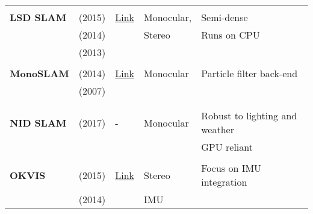 {\begin{longtable}{l|l|l|l|l}
			&                                   &                                                                    &                       &\\
			\textbf{LSD SLAM}      & \cite{Engel2015} (2015)           & {\href{https://github.com/tum-vision/lsd_slam}{Link}}              & Monocular,            & Semi-dense\\
			& \cite{engel14eccv} (2014)           &                                                                    & Stereo                & Runs on CPU\\
			& \cite{engel2013iccv} (2013)           &                                                                    &                       &\\
			&                                   &                                                                    &                       &\\
			\textbf{MonoSLAM}      & \cite{Russo2014} (2014)           & {\href{https://github.com/rrg-polito/mono-slam}{Link}}             & Monocular             & Particle filter back-end\\
			& \cite{Davison2007} (2007)         &                                                                    &                       &\\
			&                                   &                                                                    &                       &\\
			&                                   &                                                                    &                       &\\
			\textbf{NID SLAM}      & \cite{Pascoe2017} (2017)          & -                                                                  & Monocular             & Robust to lighting and weather\\
			&                                   &                                                                    &                       & GPU reliant\\
			&                                   &                                                                    &                       &\\
			\textbf{OKVIS}         & \cite{Leutenegger2015} (2015)     & {\href{https://github.com/ethz-asl/okvis_ros}{Link}}               & Stereo                & Focus on IMU integration\\
			& \cite{Leutenegger2014} (2014)     &                                                                    & IMU                   &\\

\end{longtable}}
